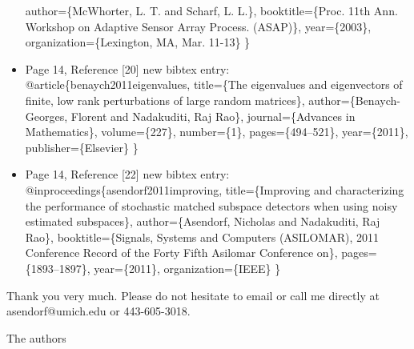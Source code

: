 \documentclass[11pt]{article}
\begin{document}
\begin{itemize}
  author=\{McWhorter, L. T.  and Scharf, L. L.\},
  booktitle=\{Proc. 11th Ann. Workshop on Adaptive Sensor Array Process. (ASAP)\},
  year=\{2003\},
  organization=\{Lexington, MA, Mar. 11-13\}
\}
  \item Page 14, Reference [20] new bibtex entry:\\
@article\{benaych2011eigenvalues,
  title=\{The eigenvalues and eigenvectors of finite, low rank perturbations of large random matrices\},
  author=\{Benaych-Georges, Florent and Nadakuditi, Raj Rao\},
  journal=\{Advances in Mathematics\},
  volume=\{227\},
  number=\{1\},
  pages=\{494--521\},
  year=\{2011\},
  publisher=\{Elsevier\}
\}
  \item Page 14, Reference [22] new bibtex entry:\\
@inproceedings\{asendorf2011improving,
  title=\{Improving and characterizing the performance of stochastic matched subspace detectors when using noisy estimated subspaces\},
  author=\{Asendorf, Nicholas and Nadakuditi, Raj Rao\},
  booktitle=\{Signals, Systems and Computers (ASILOMAR), 2011 Conference Record of the Forty Fifth Asilomar Conference on\},
  pages=\{1893--1897\},
  year=\{2011\},
  organization=\{IEEE\}
\}
\end{itemize}


Thank you very much. Please do not hesitate to email or call me directly at
asendorf@umich.edu or 443-605-3018.


The authors
\end{document}
